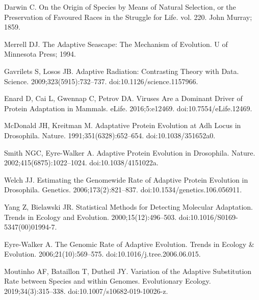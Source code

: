 \documentclass[10pt,letterpaper]{article}
\begin{document}
\begin{thebibliography}{10}

Darwin C.
\newblock On the {{Origin}} of {{Species}} by {{Means}} of {{Natural
Selection}}, or the {{Preservation}} of {{Favoured Races}} in the
{{Struggle}} for {{Life}}. vol. 220.
\newblock John Murray; 1859.

Merrell DJ.
\newblock The {{Adaptive Seascape}}: {{The Mechanism}} of {{Evolution}}.
\newblock U of Minnesota Press; 1994.

Gavrilets S, Losos JB.
\newblock Adaptive {{Radiation}}: {{Contrasting Theory}} with {{Data}}.
\newblock Science. 2009;323(5915):732--737.
\newblock doi:{10.1126/science.1157966}.

Enard D, Cai L, Gwennap C, Petrov DA.
\newblock Viruses Are a Dominant Driver of Protein Adaptation in Mammals.
\newblock eLife. 2016;5:e12469.
\newblock doi:{10.7554/eLife.12469}.

McDonald JH, Kreitman M.
\newblock Adaptative Protein Evolution at {{Adh}} Locus in {{Drosophila}}.
\newblock Nature. 1991;351(6328):652--654.
\newblock doi:{10.1038/351652a0}.

Smith NGC, {Eyre-Walker} A.
\newblock Adaptive Protein Evolution in {{Drosophila}}.
\newblock Nature. 2002;415(6875):1022--1024.
\newblock doi:{10.1038/4151022a}.

Welch JJ.
\newblock Estimating the {{Genomewide Rate}} of {{Adaptive Protein Evolution}}
in {{Drosophila}}.
\newblock Genetics. 2006;173(2):821--837.
\newblock doi:{10.1534/genetics.106.056911}.

Yang Z, Bielawski JR.
\newblock Statistical Methods for Detecting Molecular Adaptation.
\newblock Trends in Ecology and Evolution. 2000;15(12):496--503.
\newblock doi:{10.1016/S0169-5347(00)01994-7}.

{Eyre-Walker} A.
\newblock The Genomic Rate of Adaptive Evolution.
\newblock Trends in Ecology \& Evolution. 2006;21(10):569--575.
\newblock doi:{10.1016/j.tree.2006.06.015}.

Moutinho AF, Bataillon T, Dutheil JY.
\newblock Variation of the Adaptive Substitution Rate between Species and
within Genomes.
\newblock Evolutionary Ecology. 2019;34(3):315--338.
\newblock doi:{10.1007/s10682-019-10026-z}.


\end{thebibliography}
\end{document}

